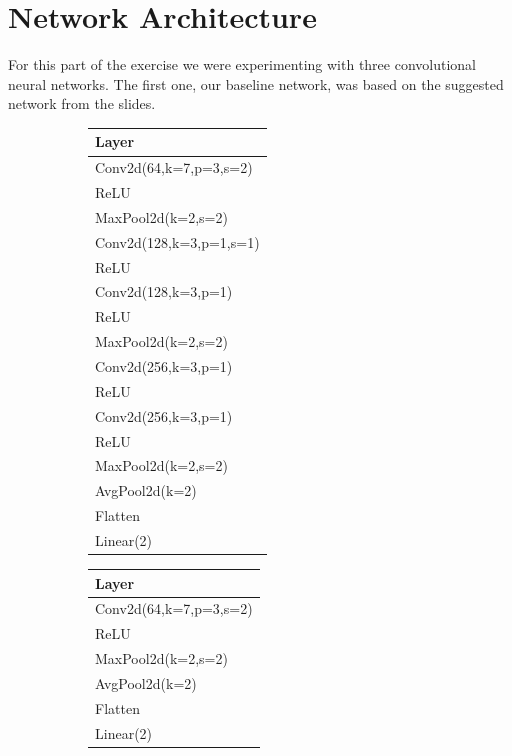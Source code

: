 \documentclass[sigconf,nonacm]{acmart}
\begin{document}
\section{Network Architecture}

For this part of the exercise we were
experimenting with three convolutional neural networks.
The first one, our baseline network, was
based on the suggested network from the slides.

\begin{figure}[ht]
  \begin{subfigure}[c]{0.3\columnwidth}
    \scriptsize
    \begin{tabular}{l}
      Layer \\
      \hline
      Conv2d(64,k=7,p=3,s=2) \\
      ReLU  \\
      MaxPool2d(k=2,s=2) \\
      Conv2d(128,k=3,p=1,s=1) \\
      ReLU \\
      Conv2d(128,k=3,p=1)  \\
      ReLU \\
      MaxPool2d(k=2,s=2) \\
      Conv2d(256,k=3,p=1) \\
      ReLU \\
      Conv2d(256,k=3,p=1) \\
      ReLU \\
      MaxPool2d(k=2,s=2) \\
      AvgPool2d(k=2) \\
      Flatten \\
      Linear(2) 
    \end{tabular}
  \end{subfigure}
  \begin{subfigure}[c]{0.3\columnwidth}
    \scriptsize
    \begin{tabular}{l}
      Layer \\
      \hline
      Conv2d(64,k=7,p=3,s=2) \\
      ReLU  \\
      MaxPool2d(k=2,s=2) \\
      AvgPool2d(k=2) \\
      Flatten \\
      Linear(2) 
    \end{tabular}
  \end{subfigure}
  \begin{subfigure}[c]{0.3\columnwidth}

\end{subfigure}
\end{figure}
\end{document}

